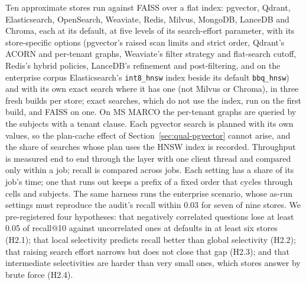 Ten approximate stores run against FAISS over a flat index: pgvector, Qdrant, Elasticsearch,
OpenSearch, Weaviate, Redis, Milvus, MongoDB, LanceDB and Chroma, each at its default, at five levels
of its search-effort parameter, with its store-specific options (pgvector's raised scan limits and
strict order, Qdrant's ACORN and per-tenant graphs, Weaviate's filter strategy and flat-search cutoff,
Redis's hybrid policies, LanceDB's refinement and post-filtering, and on the enterprise corpus
Elasticsearch's \texttt{int8\_hnsw} index beside its default \texttt{bbq\_hnsw}) and with its own
exact search where it has one (not Milvus or Chroma), in three fresh builds per store; exact searches,
which do not use the index, run on the first build, and FAISS on one. On MS MARCO the per-tenant
graphs are queried by the subjects with a tenant clause. Each pgvector search is planned with its own
values, so the plan-cache effect of Section~\ref{sec:qual-pgvector} cannot arise, and the share of
searches whose plan uses the HNSW index is recorded. Throughput is measured end to end through the
layer with one client thread and compared only within a job; recall is compared across jobs. Each
setting has a share of its job's time; one that runs out keeps a prefix of a fixed order that cycles
through cells and subjects. The same harness runs the enterprise scenario, whose as-run settings must
reproduce the audit's recall within 0.03 for seven of nine stores. We pre-registered four hypotheses: that negatively correlated questions lose at least 0.05
of recall@10 against uncorrelated ones at defaults in at least six stores (H2.1); that local
selectivity predicts recall better than global selectivity (H2.2); that raising search effort
narrows but does not close that gap (H2.3); and that intermediate selectivities are harder than very
small ones, which stores answer by brute force (H2.4).


